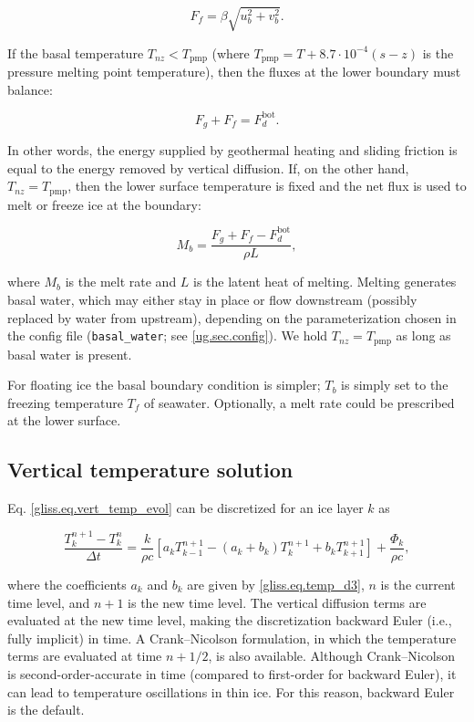 \begin{equation}
  F_f = \beta \sqrt{u_b^2 + v_b^2}.
\end{equation}

If the basal temperature $T_{nz} < T_{\mathrm{pmp}}$ 
(where $T_{\mathrm{pmp}} = T + 8.7\cdot 10^{-4}(s-z)$ is the pressure melting point temperature),
then the fluxes at the lower boundary must balance:

\begin{equation}
  F_g + F_f = F_{d}^{\mathrm{bot}}.
\end{equation}

\noindent
In other words, the energy supplied by geothermal heating and sliding friction is equal
to the energy removed by vertical diffusion.
If, on the other hand, $T_{nz} = T_{\mathrm{pmp}}$, then the
lower surface temperature is fixed and the net flux is used to melt or freeze ice at the boundary:

\begin{equation}
  \label{gliss.eq.basal_melt}
  M_b = \frac{F_g + F_f - F_d^{\mathrm{bot}}}{\rho L},
\end{equation}
 
\noindent
where $M_b$ is the melt rate and $L$ is the latent heat of melting.
Melting generates basal water, which may either stay in place or flow downstream
(possibly replaced by water from upstream), depending on the
parameterization chosen in the config file (\texttt{basal\_water}; see \ref{ug.sec.config}).
We hold $T_{nz} = T_{\mathrm{pmp}}$ as long as basal water is present.

For floating ice the basal boundary condition is simpler; $T_b$ is simply
set to the freezing temperature $T_f$ of seawater. Optionally, a melt rate could
be prescribed at the lower surface.

\subsection{Vertical temperature solution}

Eq. \eqref{gliss.eq.vert_temp_evol} can be discretized for an ice layer $k$ as

\begin{equation}
  \label{gliss.eq.dTdt1}
  \frac{T_{k}^{n+1}-T_{k}^{n}}{\Delta t} =
  \frac{k}{\rho c}\left[ {{a}_{k}}T_{k-1}^{n+1}-({{a}_{k}}+{{b}_{k}})T_{k}^{n+1}+{{b}_{k}}T_{k+1}^{n+1} \right]+\frac{{{\Phi }_{k}}}{\rho c},
\end{equation}

\noindent
where the coefficients $a_k$ and $b_k$ are given by \eqref{gliss.eq.temp_d3}, $n$ is the current time level,
and $n+1$ is the new time level.  The vertical diffusion terms are evaluated at the new time level,
making the discretization backward Euler (i.e., fully implicit) in time.  A Crank--Nicolson formulation, in which the temperature
terms are evaluated at time $n+1/2$, is also available.  Although Crank--Nicolson is second-order-accurate
in time (compared to first-order for backward Euler), it can lead to temperature oscillations in thin ice.
For this reason, backward Euler is the default.

